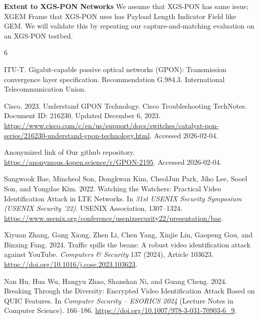 \documentclass[sigconf,anonymous]{acmart}
\begin{document}
\textbf{Extent to XGS-PON Networks} We assume that XGS-PON has same issue; XGEM Frame that XGS-PON uses has Payload Length Indicator Field like GEM. We will validate this by repeating our capture-and-matching evaluation on an XGS-PON testbed.

\begin{thebibliography}{6}

ITU-T. Gigabit-capable passive optical networks (GPON): Transmission convergence layer specification. Recommendation G.984.3. International Telecommunication Union.

Cisco. 2023. Understand GPON Technology. Cisco Troubleshooting TechNotes. Document ID: 216230. Updated December 6, 2023. \url{https://www.cisco.com/c/en/us/support/docs/switches/catalyst-pon-series/216230-understand-gpon-technology.html}. Accessed 2026-02-04.

Anonymized link of Our github repository. \url{https://anonymous.4open.science/r/GPON-2195}. Accessed 2026-02-04.

Sangwook Bae, Mincheol Son, Dongkwan Kim, CheolJun Park, Jiho Lee, Sooel Son, and Yongdae Kim. 2022. Watching the Watchers: Practical Video Identification Attack in LTE Networks. In \emph{31st USENIX Security Symposium (USENIX Security '22)}. USENIX Association, 1307--1324. \url{https://www.usenix.org/conference/usenixsecurity22/presentation/bae}.

Xiyuan Zhang, Gang Xiong, Zhen Li, Chen Yang, Xinjie Lin, Gaopeng Gou, and Binxing Fang. 2024. Traffic spills the beans: A robust video identification attack against YouTube. \emph{Computers \& Security} 137 (2024), Article 103623. \url{https://doi.org/10.1016/j.cose.2023.103623}.

Nan Hu, Hua Wu, Hangyu Zhao, Shanshan Ni, and Guang Cheng. 2024. Breaking Through the Diversity: Encrypted Video Identification Attack Based on QUIC Features. In \emph{Computer Security -- ESORICS 2024} (Lecture Notes in Computer Science). 166--186. \url{https://doi.org/10.1007/978-3-031-70903-6_9}.

\end{thebibliography}
\end{document}
